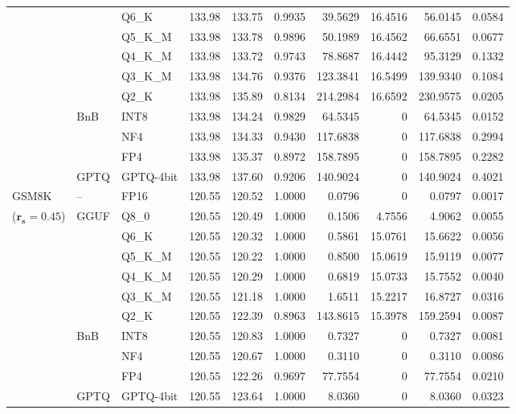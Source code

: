\begin{longtable}{ll l rrrrrrr}
 &  & Q6\_K & 133.98 & 133.75 & 0.9935 & 39.5629 & 16.4516 & 56.0145 & 0.0584 \\
 &  & Q5\_K\_M & 133.98 & 133.78 & 0.9896 & 50.1989 & 16.4562 & 66.6551 & 0.0677 \\
 &  & Q4\_K\_M & 133.98 & 133.72 & 0.9743 & 78.8687 & 16.4442 & 95.3129 & 0.1332 \\
 &  & Q3\_K\_M & 133.98 & 134.76 & \cellcolor{red!18} 0.9376 & \cellcolor{red!18} 123.3841 & 16.5499 & \cellcolor{red!18} 139.9340 & \cellcolor{red!18} 0.1084 \\
 &  & Q2\_K & 133.98 & 135.89 & \cellcolor{red!18} 0.8134 & \cellcolor{red!18} 214.2984 & 16.6592 & \cellcolor{red!18} 230.9575 & \cellcolor{red!18} 0.0205 \\
 & BnB & INT8 & 133.98 & 134.24 & 0.9829 & 64.5345 & \cellcolor{cyan!12} $0$ & 64.5345 & 0.0152 \\
 &  & NF4 & 133.98 & 134.33 & \cellcolor{red!18} 0.9430 & \cellcolor{red!18} 117.6838 & \cellcolor{cyan!12} $0$ & \cellcolor{red!18} 117.6838 & \cellcolor{red!18} 0.2994 \\
 &  & FP4 & 133.98 & 135.37 & \cellcolor{red!18} 0.8972 & \cellcolor{red!18} 158.7895 & \cellcolor{cyan!12} $0$ & \cellcolor{red!18} 158.7895 & \cellcolor{red!18} 0.2282 \\
 & GPTQ & GPTQ-4bit & 133.98 & 137.60 & \cellcolor{red!18} 0.9206 & \cellcolor{red!18} 140.9024 & \cellcolor{cyan!12} $0$ & \cellcolor{red!18} 140.9024 & \cellcolor{red!18} 0.4021 \\
\midrule
GSM8K & -- & FP16 & 120.55 & 120.52 & 1.0000 & 0.0796 & \cellcolor{cyan!12} $0$ & 0.0797 & 0.0017 \\
{\small ($\mathbf{r_s{=}0.45}$)} & GGUF & Q8\_0 & 120.55 & 120.49 & 1.0000 & 0.1506 & 4.7556 & 4.9062 & 0.0055 \\
 &  & Q6\_K & 120.55 & 120.32 & 1.0000 & 0.5861 & 15.0761 & 15.6622 & 0.0056 \\
 &  & Q5\_K\_M & 120.55 & 120.22 & 1.0000 & 0.8500 & 15.0619 & 15.9119 & 0.0077 \\
 &  & Q4\_K\_M & 120.55 & 120.29 & 1.0000 & 0.6819 & 15.0733 & 15.7552 & 0.0040 \\
 &  & Q3\_K\_M & 120.55 & 121.18 & 1.0000 & 1.6511 & 15.2217 & 16.8727 & 0.0316 \\
 &  & Q2\_K & 120.55 & 122.39 & \cellcolor{red!18} 0.8963 & \cellcolor{red!18} 143.8615 & 15.3978 & \cellcolor{red!18} 159.2594 & \cellcolor{red!18} 0.0087 \\
 & BnB & INT8 & 120.55 & 120.83 & 1.0000 & 0.7327 & \cellcolor{cyan!12} $0$ & 0.7327 & 0.0081 \\
 &  & NF4 & 120.55 & 120.67 & 1.0000 & 0.3110 & \cellcolor{cyan!12} $0$ & 0.3110 & 0.0086 \\
 &  & FP4 & 120.55 & 122.26 & 0.9697 & 77.7554 & \cellcolor{cyan!12} $0$ & 77.7554 & 0.0210 \\
 & GPTQ & GPTQ-4bit & 120.55 & 123.64 & 1.0000 & 8.0360 & \cellcolor{cyan!12} $0$ & 8.0360 & 0.0323 \\
\end{longtable}
\endgroup